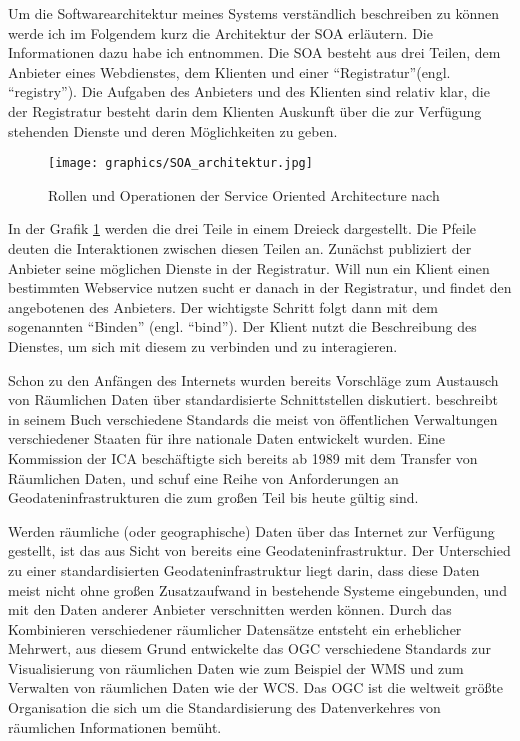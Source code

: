 Um die Softwarearchitektur meines Systems verständlich beschreiben zu können werde ich im Folgendem kurz die Architektur der \gls{SOA} erläutern. Die Informationen dazu habe ich \citep{papazoglou_web_2008} entnommen. Die \gls{SOA} besteht aus drei Teilen, dem Anbieter eines Webdienstes, dem Klienten und einer ``Registratur''(engl. ``registry''). Die Aufgaben des Anbieters und des Klienten sind relativ klar, die der Registratur besteht darin dem Klienten Auskunft über die zur Verfügung stehenden Dienste und deren Möglichkeiten zu geben. 

\begin{figure}[H]
	\centering
 	 \texttt{[image: graphics/SOA\_architektur.jpg]} 
	\caption{Rollen und Operationen der Service Oriented Architecture nach \cite{papazoglou_web_2008}}
	 \label{fig:SOA_architektur}
\end{figure}

In der Grafik \ref{fig:SOA_architektur} werden die drei Teile in einem Dreieck dargestellt. Die Pfeile deuten die Interaktionen zwischen diesen Teilen an. Zunächst publiziert der Anbieter seine möglichen Dienste in der Registratur. Will nun ein Klient einen bestimmten Webservice nutzen sucht er danach in der Registratur, und findet den angebotenen des Anbieters. Der wichtigste Schritt folgt dann mit dem sogenannten ``Binden'' (engl. ``bind''). Der Klient nutzt die Beschreibung des Dienstes, um sich mit diesem zu verbinden und zu interagieren.

Schon zu den Anfängen des Internets wurden bereits Vorschläge zum Austausch von Räumlichen Daten über standardisierte Schnittstellen diskutiert. \citep{moellering_spatial_1997} beschreibt in seinem Buch verschiedene Standards die meist von öffentlichen Verwaltungen verschiedener Staaten für ihre nationale Daten entwickelt wurden. Eine Kommission der \gls{ICA} beschäftigte sich bereits ab 1989 mit dem Transfer von Räumlichen Daten, und schuf eine Reihe von Anforderungen an Geodateninfrastrukturen die zum großen Teil bis heute gültig sind. 

Werden räumliche (oder geographische) Daten über das Internet zur Verfügung gestellt, ist das aus Sicht von \citep{aalders_spatial_2001} bereits eine Geodateninfrastruktur. Der Unterschied zu einer standardisierten Geodateninfrastruktur liegt darin, dass diese Daten meist nicht ohne großen Zusatzaufwand in bestehende Systeme eingebunden, und mit den Daten anderer Anbieter verschnitten werden können. Durch das Kombinieren verschiedener räumlicher Datensätze entsteht ein erheblicher Mehrwert, aus diesem Grund entwickelte das \gls{OGC} verschiedene Standards zur Visualisierung von räumlichen Daten wie zum Beispiel der \gls{WMS} und zum Verwalten von räumlichen Daten wie der \gls{WCS}. Das \gls{OGC} ist die weltweit größte Organisation die sich um die Standardisierung des Datenverkehres von räumlichen Informationen bemüht. 

